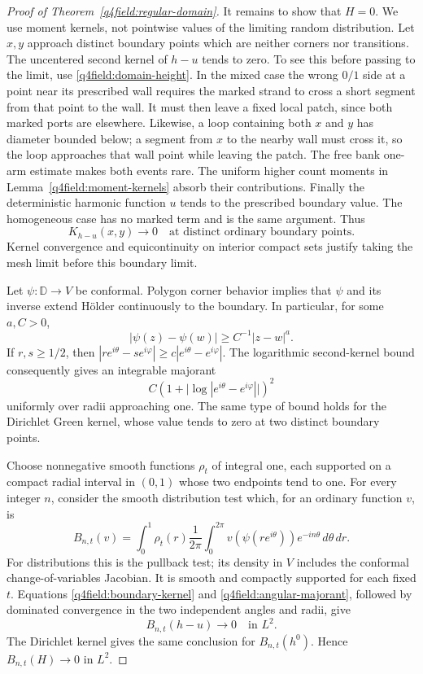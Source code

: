 \begin{proof}[Proof of Theorem~\ref{q4field:regular-domain}]
It remains to show that $H=0$.  We use moment kernels, not pointwise
values of the limiting random distribution.  Let $x,y$ approach
distinct boundary points which are neither corners nor transitions.
The uncentered second kernel of $h-u$ tends to zero.  To see this
before passing to the limit, use
\eqref{q4field:domain-height}.  In the mixed case the wrong
$0/1$ side at a point near its prescribed wall requires the marked
strand to cross a short segment from that point to the wall.  It
must then leave a fixed local patch, since both marked ports are
elsewhere.  Likewise, a loop containing both $x$ and $y$ has diameter
bounded below; a segment from $x$ to the nearby wall must cross it,
so the loop approaches that wall point while leaving the patch.
The free bank one-arm estimate makes both events rare.  The uniform
higher count moments in Lemma~\ref{q4field:moment-kernels} absorb
their contributions.  Finally the deterministic harmonic function
$u$ tends to the prescribed boundary value.  The homogeneous case
has no marked term and is the same argument.  Thus
\begin{equation}\label{q4field:boundary-kernel}
 K_{h-u}(x,y)\longrightarrow0
 \quad\text{at distinct ordinary boundary points}.
\end{equation}
Kernel convergence and equicontinuity on interior compact sets
justify taking the mesh limit before this boundary limit.

Let $\psi:\mathbb D\to V$ be conformal.  Polygon corner behavior
implies that $\psi$ and its inverse extend H\"older continuously to
the boundary.  In particular, for some $a,C>0$,
\[
 |\psi(z)-\psi(w)|\ge C^{-1}|z-w|^a.
\]
If $r,s\ge1/2$, then
$|re^{i\theta}-se^{i\varphi}|\ge c|e^{i\theta}-e^{i\varphi}|$.
The logarithmic second-kernel bound consequently gives an integrable
majorant
\begin{equation}\label{q4field:angular-majorant}
 C\left(1+
    \bigl|\log|e^{i\theta}-e^{i\varphi}|\bigr|\right)^2
\end{equation}
uniformly over radii approaching one.  The same type of bound holds
for the Dirichlet Green kernel, whose value tends to zero at two
distinct boundary points.

Choose nonnegative smooth functions $\rho_t$ of integral one, each
supported on a compact radial interval in $(0,1)$ whose two endpoints
tend to one.  For every integer $n$, consider the smooth distribution
test which, for an ordinary function $v$, is
\[
 B_{n,t}(v)=\int_0^1\rho_t(r)
       \frac1{2\pi}\int_0^{2\pi}
       v(\psi(re^{i\theta}))e^{-in\theta}\,d\theta\,dr.
\]
For distributions this is the pullback test; its density in $V$
includes the conformal change-of-variables Jacobian.  It is smooth
and compactly supported for each fixed $t$.  Equations
\eqref{q4field:boundary-kernel} and
\eqref{q4field:angular-majorant}, followed by dominated convergence
in the two independent angles and radii, give
\[
 B_{n,t}(h-u)\longrightarrow0\quad\text{in }L^2.
\]
The Dirichlet kernel gives the same conclusion for $B_{n,t}(h^0)$.
Hence $B_{n,t}(H)\to0$ in $L^2$.


\end{proof}
